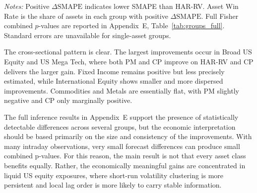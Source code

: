 \documentclass[11pt,a4paper]{article}
\begin{document}
{\renewcommand{\thetable}{5}
\begin{center}
\label{tab:groups}
\small
\renewcommand{\arraystretch}{1.15}
\setlength{\tabcolsep}{5pt}

\vspace{0.1cm}
\footnotesize \parbox{0.92\textwidth}{\textit{Notes:} Positive $\Delta \mathrm{SMAPE}$ indicates lower SMAPE than HAR-RV. Asset Win Rate is the share of assets in each group with positive $\Delta \mathrm{SMAPE}$. Full Fisher combined $p$-values are reported in Appendix~E, Table~\ref{tab:groups_full}. Standard errors are unavailable for single-asset groups.}
\end{center}}

\noindent
The cross-sectional pattern is clear. The largest improvements occur in Broad US Equity and US Mega Tech, where both PM and CP improve on HAR-RV and CP delivers the larger gain. Fixed Income remains positive but less precisely estimated, while International Equity shows smaller and more dispersed improvements. Commodities and Metals are essentially flat, with PM slightly negative and CP only marginally positive.

\noindent
The full inference results in Appendix~E support the presence of statistically detectable differences across several groups, but the economic interpretation should be based primarily on the size and consistency of the improvements. With many intraday observations, very small forecast differences can produce small combined p-values. For this reason, the main result is not that every asset class benefits equally. Rather, the economically meaningful gains are concentrated in liquid US equity exposures, where short-run volatility clustering is more persistent and local lag order is more likely to carry stable information.
\end{document}
